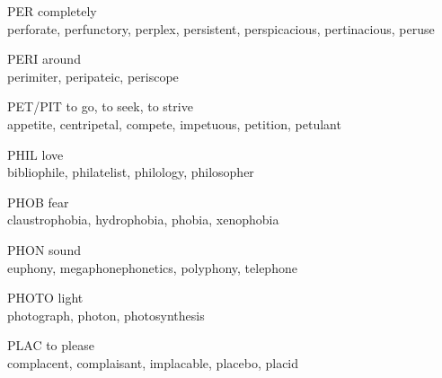 \begin{flashcard}[Roots]{PER}
completely\\
\vspace{0.2in}
perforate, perfunctory, perplex, persistent, perspicacious, pertinacious, peruse\\
\end{flashcard}

\begin{flashcard}[Roots]{PERI}
around\\
\vspace{0.2in}
perimiter, peripateic, periscope\\
\end{flashcard}

\begin{flashcard}[Roots]{PET/PIT}
to go, to seek, to strive\\
\vspace{0.2in}
appetite, centripetal, compete, impetuous, petition, petulant\\
\end{flashcard}

\begin{flashcard}[Roots]{PHIL}
love\\
\vspace{0.2in}
bibliophile, philatelist, philology, philosopher\\
\end{flashcard}

\begin{flashcard}[Roots]{PHOB}
fear\\
\vspace{0.2in}
claustrophobia, hydrophobia, phobia, xenophobia\\
\end{flashcard}

\begin{flashcard}[Roots]{PHON}
sound\\
\vspace{0.2in}
euphony, megaphonephonetics, polyphony, telephone\\
\end{flashcard}

\begin{flashcard}[Roots]{PHOTO}
light\\
\vspace{0.2in}
photograph, photon, photosynthesis\\
\end{flashcard}

\begin{flashcard}[Roots]{PLAC}
to please\\
\vspace{0.2in}
complacent, complaisant, implacable, placebo, placid\\
\end{flashcard}

